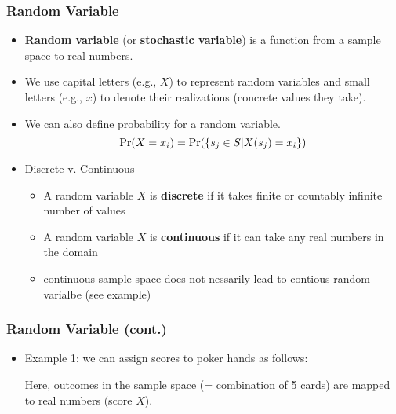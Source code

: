 \documentclass[pdflatex, 12pt]{beamer}
\begin{document}
\begin{frame}
\frametitle{Random Variable}
\begin{itemize}
\item \textbf{Random variable} (or \textbf{stochastic variable}) is a function from a sample space to real numbers.
\vspace{0.4cm}
\item We use capital letters (e.g., $X$) to represent random variables and small letters (e.g., $x$) to denote their realizations (concrete values they take).
\vspace{0.4cm}
\item We can also define probability for a random variable.
 \begin{equation}
 \Pr(X = x_i) = \Pr(\left\{s_j \in S|X(s_j) = x_i\right\}) \notag
 \end{equation}
\item Discrete v. Continuous 
 \begin{itemize}
 \item A random variable $X$ is \textbf{discrete} if it takes finite or countably infinite number of values
 \item A random variable $X$ is \textbf{continuous} if it can take any real numbers in the domain
 \item continuous sample space does not nessarily lead to contious random varialbe (see example)
 \end{itemize}
\end{itemize}
\end{frame}

\begin{frame}
\frametitle{Random Variable (cont.)}
\begin{itemize}
\item Example 1: we can assign scores to poker hands as follows:
 \begin{table}
 \end{table}
Here, outcomes in the sample space (= combination of 5 cards) are mapped to real numbers (score $X$).
\end{itemize} 
\end{frame}
\end{document}
